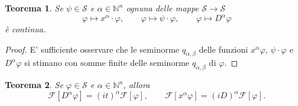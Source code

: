\documentclass[italian,a4paper,oneside,headinclude]{scrbook}
\renewcommand{\phi}{\varphi}
\newcommand{\F}{\mathcal F}
\renewcommand{\S}{\mathcal S}
\newcommand{\NN}{\mathbb N}
\newtheorem{theorem}{Teorema}
\begin{document}
\begin{theorem}\label{th:proprietaS}
  Se $\psi\in \S$ e $\alpha\in \NN^n$ ognuna
  delle mappe $\S\to\S$
  \[
  \phi \mapsto x^\alpha \cdot \phi,\qquad
  \phi \mapsto \psi\cdot \phi,\qquad
  \phi \mapsto D^\alpha \phi
  \]
  è continua.
\end{theorem}
%
\begin{proof}
    E' sufficiente osservare che le seminorme $q_{\alpha,\beta}$ delle
    funzioni $x^\alpha \phi$, $\psi \cdot \phi$ e $D^\alpha \phi$ si stimano con
    somme finite delle seminorme $q_{\alpha,\beta}$ di $\phi$.
\end{proof}

\begin{theorem}\label{th:proprietaF}
  Se $\phi\in \S$ e $\alpha\in\NN^n$, allora
  \[
  \F[D^\alpha \phi] = (it)^\alpha \F[\phi],\qquad
  \F[x^\alpha \phi] = (iD)^\alpha \F[\phi].
  \]
\end{theorem}
%
\end{document}
